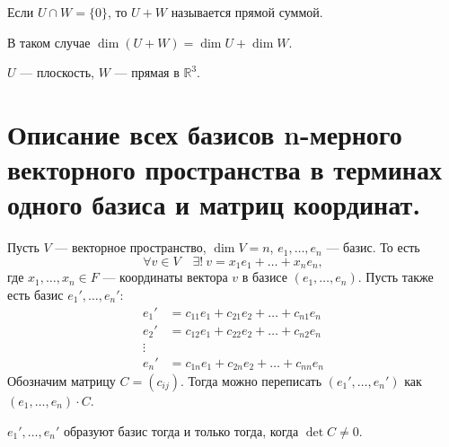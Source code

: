 \begin{Def}
Если $U \cap W = \{0\}$, то $U + W$ называется прямой суммой.
\end{Def}
\begin{Consequence}
В таком случае $\dim\left(U+W\right) = \dim U + \dim W$.
\end{Consequence}
\begin{Examples}
    $U$ --- плоскость, $W$ --- прямая в $\mathbb{R}^3$.
\end{Examples}


\section{Описание всех базисов n-мерного векторного пространства в терминах одного базиса и матриц координат.}

Пусть $V$ --- векторное пространство, $\dim V = n$, $e_1, \ldots, e_n$ --- базис. То есть
\[
\forall v \in V \quad \exists!\: v = x_1e_1 + \ldots + x_ne_n,
\]
где $x_1, \ldots, x_n \in F$ --- координаты вектора $v$ в базисе $\left(e_1, \ldots, e_n\right)$. 
Пусть также есть базис $e_1', \ldots, e_n'$:
\begin{align*}
    e_1' &= c_{11}e_1 + c_{21}e_2 + \ldots + c_{n1}e_n\\
    e_2' &= c_{12}e_1 + c_{22}e_2 + \ldots + c_{n2}e_n\\
    \vdots\\
    e_n' &= c_{1n}e_1 + c_{2n}e_2 + \ldots + c_{nn}e_n
\end{align*}
Обозначим матрицу $C = \left(c_{ij}\right)$. Тогда можно переписать $\left(e_1', \ldots, e_n'\right)$ как $\left(e_1, \ldots, e_n\right)\cdot C$.
\begin{Suggestion}
$e_1', \ldots, e_n'$ образуют базис тогда и только тогда, когда $\det C \neq 0$.
\end{Suggestion}

